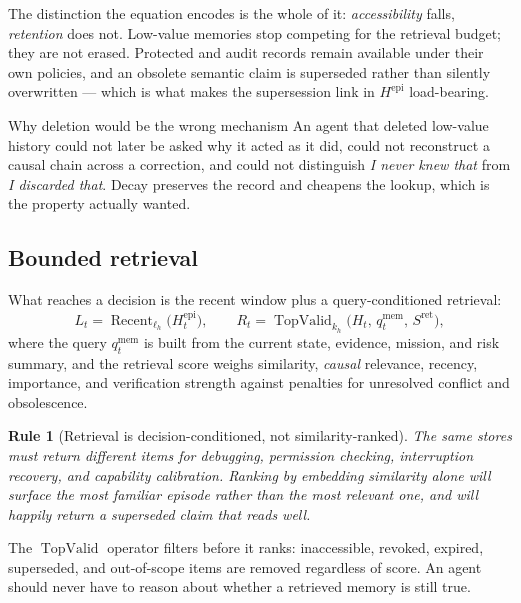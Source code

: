 \documentclass[11pt]{article}
\newtheorem{drule}{Rule}
\newcommand{\op}[1]{\operatorname{#1}}
\begin{document}
The distinction the equation encodes is the whole of it: \emph{accessibility} falls, \emph{retention} does not. Low-value memories stop competing for the retrieval budget; they are not erased. Protected and audit records remain available under their own policies, and an obsolete semantic claim is superseded rather than silently overwritten --- which is what makes the supersession link in $H^{\mathrm{epi}}$ load-bearing.

\begin{cautionbox}{Why deletion would be the wrong mechanism}
An agent that deleted low-value history could not later be asked why it acted as it did, could not reconstruct a causal chain across a correction, and could not distinguish \emph{I never knew that} from \emph{I discarded that}. Decay preserves the record and cheapens the lookup, which is the property actually wanted.
\end{cautionbox}

\subsection{Bounded retrieval}

What reaches a decision is the recent window plus a query-conditioned retrieval:
\begin{equation}
L_t=\op{Recent}_{\ell_h}\big(H^{\mathrm{epi}}_t\big),
\qquad
R_t=\op{TopValid}_{k_h}\big(H_t,\,q^{\mathrm{mem}}_t,\,S^{\mathrm{ret}}\big),
\label{eq:retrieve}
\end{equation}
where the query $q^{\mathrm{mem}}_t$ is built from the current state, evidence, mission, and risk summary, and the retrieval score weighs similarity, \emph{causal} relevance, recency, importance, and verification strength against penalties for unresolved conflict and obsolescence.

\begin{drule}[Retrieval is decision-conditioned, not similarity-ranked]
\label{rule:retrieval}
The same stores must return different items for debugging, permission checking, interruption recovery, and capability calibration. Ranking by embedding similarity alone will surface the most \emph{familiar} episode rather than the most \emph{relevant} one, and will happily return a superseded claim that reads well.
\end{drule}

The $\op{TopValid}$ operator filters before it ranks: inaccessible, revoked, expired, superseded, and out-of-scope items are removed regardless of score. An agent should never have to reason about whether a retrieved memory is still true.
\end{document}
